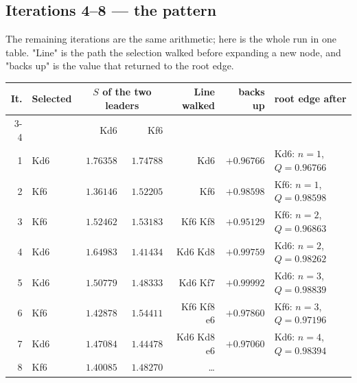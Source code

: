 \subsection*{Iterations 4--8 --- the pattern}

The remaining iterations are the same arithmetic; here is the whole run in one table.
"Line" is the path the selection walked before expanding a new node, and "backs up" is the
value that returned to the root edge.

\begin{center}\small
\begin{tabular}{@{}rlrrrrl@{}}
\toprule
It. & Selected & \multicolumn{2}{c}{$S$ of the two leaders} & Line walked & backs up & root edge after \\
\cmidrule(lr){3-4}
 &  & Kd6 & Kf6 & & & \\
\midrule
1 & Kd6 & $1.76358$ & $1.74788$ & Kd6            & $+0.96766$ & Kd6: $n{=}1$, $Q{=}0.96766$ \\
2 & Kf6 & $1.36146$ & $1.52205$ & Kf6            & $+0.98598$ & Kf6: $n{=}1$, $Q{=}0.98598$ \\
3 & Kf6 & $1.52462$ & $1.53183$ & Kf6 Kf8        & $+0.95129$ & Kf6: $n{=}2$, $Q{=}0.96863$ \\
4 & Kd6 & $1.64983$ & $1.41434$ & Kd6 Kd8        & $+0.99759$ & Kd6: $n{=}2$, $Q{=}0.98262$ \\
5 & Kd6 & $1.50779$ & $1.48333$ & Kd6 Kf7        & $+0.99992$ & Kd6: $n{=}3$, $Q{=}0.98839$ \\
6 & Kf6 & $1.42878$ & $1.54411$ & Kf6 Kf8 e6     & $+0.97860$ & Kf6: $n{=}3$, $Q{=}0.97196$ \\
7 & Kd6 & $1.47084$ & $1.44478$ & Kd6 Kd8 e6     & $+0.97060$ & Kd6: $n{=}4$, $Q{=}0.98394$ \\
8 & Kf6 & $1.40085$ & $1.48270$ & \ldots         & & \\
\bottomrule
\end{tabular}
\end{center}

